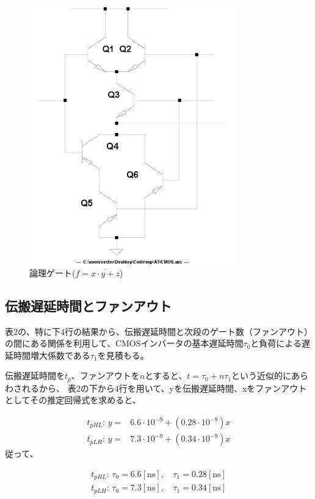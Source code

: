 \documentclass[10pt,a4j,dvipdfmx]{jsarticle}
\makeatletter
\let\@oldsubsec\subsection
\renewcommand{\subsection}[1]{\vspace{-7pt}\@oldsubsec{#1}}
\makeatother
\begin{document}
\begin{figure}[H]
       \centering
       \includegraphics[width=9cm]{CMOS.png}
       \caption{論理ゲート($f = \overline{x\cdot y+z}$)}
\end{figure}

\subsection{伝搬遅延時間とファンアウト}
表2の、特に下4行の結果から、伝搬遅延時間と次段のゲート数（ファンアウト）の間にある関係を利用して、CMOSインバータの基本遅延時間$\tau_0$と負荷による遅延時間増大係数である$\tau_1$を見積もる。

伝搬遅延時間を$t_p$、ファンアウトを$n$とすると、$t = \tau_0 + n\tau_1$という近似的にあらわされるから、
表2の下から4行を用いて、yを伝搬遅延時間、xをファンアウトとしてその推定回帰式を求めると、

\begin{align}
t_{pHL}:\hspace{2pt} y =& 6.6 \cdot 10^{-9}+\left( 0.28\cdot 10^{-9} \right) x\\
t_{pLH}:\hspace{2pt} y =& 7.3 \cdot 10^{-9} +\left( 0.34\cdot 10^{-9} \right) x
\end{align}
従って、

\begin{align}
t_{pHL}:\hspace{2pt} \tau_0 = 6.6[\si{\nano\second}], \hspace{2pt} &\tau_1 = 0.28[\si{\nano\second}]\\
t_{pLH}:\hspace{2pt} \tau_0 = 7.3[\si{\nano\second}], \hspace{2pt}  &\tau_1 = 0.34[\si{\nano\second}]
\end{align}
\end{document}
